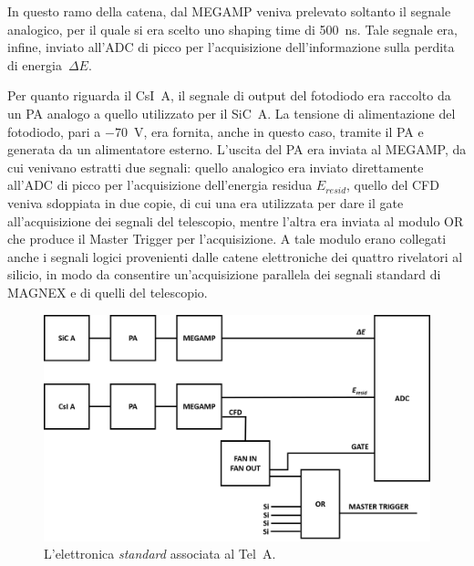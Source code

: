 In questo ramo della catena, dal MEGAMP veniva prelevato soltanto il segnale analogico, per il quale si era scelto uno shaping time di 500~ns.
Tale segnale era, infine, inviato all'ADC di picco per l'acquisizione dell'informazione sulla perdita di energia~$\Delta E$.
%

Per quanto riguarda il CsI~A, il segnale di output del fotodiodo era raccolto da un PA analogo a quello utilizzato per il SiC~A.
La tensione di alimentazione del fotodiodo, pari a $-70$~V, era fornita, anche in questo caso, tramite il PA e generata da un alimentatore esterno.
L'uscita del PA era inviata al MEGAMP, da cui venivano estratti due segnali: quello analogico era inviato direttamente all'ADC di picco per l'acquisizione dell'energia residua $E_{resid}$, quello del CFD veniva sdoppiata in due copie, di cui una era utilizzata per dare il gate all'acquisizione dei segnali del telescopio, mentre l'altra era inviata al modulo OR che produce il Master Trigger per l'acquisizione. 
A tale modulo erano collegati anche i segnali logici provenienti dalle catene elettroniche dei quattro rivelatori al silicio, in modo da consentire un'acquisizione parallela dei segnali standard di MAGNEX e di quelli del telescopio.


\begin{figure} [!p]
	\centering
	\includegraphics[width=\textwidth, keepaspectratio]{Grafici/elettronica_standard.png}
	\caption{L'elettronica \emph{standard} associata al Tel~A.} \label{fig:elettronica_standard}
\end{figure}

